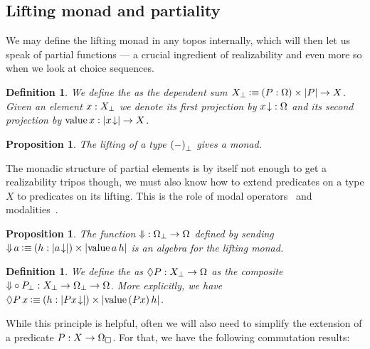 \documentclass[11pt]{article}
\newtheorem{prop}[thrm]{Proposition}
\newtheorem{defn}[thrm]{Definition}
\begin{document}
\subsection{Lifting monad and partiality}

We may define the lifting monad in any topos internally, which will then
let us speak of partial functions --- a crucial ingredient of realizability
and even more so when we look at choice sequences.

\begin{defn}\label{defn:lifting}
  We define the  as the dependent sum
  \({X}_\bot \mathbin{\vcentcolon\equiv} {(P : \Omega)}\times{|{P}|\to X}\).
  Given an element \(x : {X}_\bot\) we denote its first projection by
  \({{x}\!\downarrow} : \Omega\) and its second projection by
  \(\text{value}\,{x}: |{{{x}\!\downarrow}}| \to X\).
\end{defn}

\begin{prop}
  The lifting of a type \({(-)}_\bot\) gives a monad.
\end{prop}

The monadic structure of partial elements is by itself not enough to get
a realizability tripos though, we must also know how to extend predicates on
a type \(X\) to predicates on its lifting.
%
This is the role of modal operators~\cite{moggiNotionsComputationMonads1991} and
modalities~\cite{cohenPartialMonadicCombinatory2025}.

\begin{prop}
  The function \({\Downarrow} : {\Omega}_\bot \to \Omega\) defined by
  sending
  \(
    {\Downarrow}\,{a} \mathbin{\vcentcolon\equiv} {(h:|{{{a}\!\downarrow}}|)}\times{|{\text{value}\,{a}\,h}|}
  \)
  is an algebra for the lifting monad.
\end{prop}

\begin{defn}
  We define the  as
  \(\Diamond{P} : {X}_\bot \to \Omega\) as the composite
  \({\Downarrow}\circ{P}_\bot : {X}_\bot \to {\Omega}_\bot \to \Omega\).
  More explicitly, we have
  \(\Diamond{P}\,x\mathbin{\vcentcolon\equiv} {(h:|{{{Px}\!\downarrow}}|)}\times{|{\text{value}\,{(Px)}\,h}|}\).
\end{defn}



\newpage


While this principle is helpful, often we will also need to simplify
the extension of a predicate \(P : X \to \Omega_\Box\). For that, we have
the following commutation results:
\end{document}
